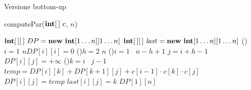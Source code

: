 \begin{frame}[shrink=10]{Versione bottom-up}

\vspace{-6pt}
\begin{Procedure}
\caption[A]{\textsf{computePar}($\INTARRAY\ c$, \INTEGER $n$)}	
$\INTARRAY[\,]\ DP = \NEW\ \INTEGER[1 \ldots n][1 \ldots n]$\;
$\INTARRAY[\,]\ \mathit{last} = \NEW\ \INTEGER[1 \ldots n][1 \ldots n]$\;
\For(){$i = 1$ \TO $n$}{$DP[i][i] = 0$\;}
\For(){$h = 2$ \TO $n$}
{
  \For(){$i = 1$ \TO\ $n-h+1$}
  {
    \INTEGER $j = i+h-1$
    $DP[i][j] = +\infty$\;
    \For(){$k = i$ \TO\ $j-1$} 
    {
      \INTEGER\ $\mathit{temp} = DP[i][k] + DP[k+1][j] + c[i-1] \cdot c[k] \cdot c[j]$\;
      {
        $DP[i][j] = \mathit{temp}$\;
        $\mathit{last}[i][j] = k$\;
      }
    }
  }
}
\Return $DP[1][n]$\;
\end{Procedure}

\end{frame}


